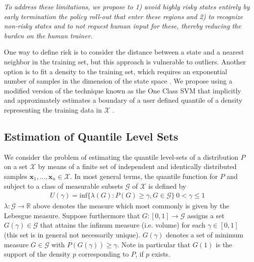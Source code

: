 \documentclass[10pt, conference]{ieeeconf}      %
\begin{document}
\emph{To address these limitations, we propose to 1) avoid highly risky states entirely by early termination the policy
roll-out that enter these regions and 2) to recognize non-risky states and to not request human input for these,
thereby reducing the burden on the human trainer. }

One way to define risk is to consider the distance between a state and a nearest neighbor in the training set, but this approach is vulnerable to
outliers. Another option is to fit a density to the training set, which requires an
exponential number of samples in the dimension of the state space \cite{nadaraya1964estimating}. We propose using a
modified version of the technique known as the One Class SVM that implicitly and approximately estimates a boundary of a user defined quantile of
a density representing the training data in $\mathcal{X}$ \cite{scholkopf2001estimating}.


\subsection{Estimation of Quantile Level Sets}\label{sec:level}
We consider the problem of estimating the quantile level-sets of a distribution $P$ on a set $\mathcal{X}$ by means of a finite set of
independent and identically distributed samples $\mathbf{x}_1,...,\mathbf{x}_n\in \mathcal{X}$.
In most general terms, the quantile function for $P$ and subject to a class of measurable subsets $\mathcal{G}$ of $\mathcal{X}$ is
defined by
\vspace{-2ex}
\begin{align}\label{eq:quantile}
U(\gamma) = \mbox{inf} \lbrace \lambda(G):P(G) \geq \gamma, G \in \mathcal{G} \rbrace \: 0<\gamma \leq 1
\end{align} 
$\lambda:\mathcal{G}\to \mathbb{R}$ above denotes the measure which most commonly is given by the Lebesgue measure.
Suppose furthermore that $G:[0,1]\to \mathcal{G}$ assigns a set $G(\gamma) \in \mathcal{G}$ that attains the infinum
measure (i.e. volume) for each $\gamma\in [0,1]$ (this set is in general not necessarily unique). 
$G(\gamma)$ denotes a set of minimum measure $G \in \mathcal{G}$ with $P(G(\gamma))\ge \gamma$. Note in particular that $G(1)$ is the support of the density $p$ corresponding to $P$, if $p$ exists. 
\end{document}
